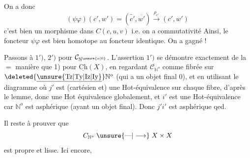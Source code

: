 On a donc
\[
(\psi\varphi)(c',w')=(\widetilde{c'},\overline{w'})\xrightarrow{\rho_{c'}}(c',w')
\]
c'est bien un morphisme dans $C(c,u,v)$ i.e. on a commutativité 
Ainsi, le foncteur $\psi\varphi$ est bien homotope au foncteur identique. On a gagné !

Passons à $1')$, $2')$ pour $\mathcal C_{\mathbb N^{\unsure{o|0}}}$. L'assertion $1')$ se démontre exactement de la $=$ manière que 1) pour $\underline{\mathrm{Ch}}(X)$, en regardant $\mathcal C_{\mathbb N^o}$ comme fibrée sur $\deleted{\underline{\unsure{\mathrm{Tz}|\mathrm{Ty}|\mathrm{Iz}|\mathrm{Iy}}}}\mathbb N^o$ (qui a un objet final $0$), et en utilisant le diagramme
 où $j'$ est (cartésien et) une Hot-équivalence sur chaque fibre, d'après le lemme, donc une Hot équivalence  globalement, et $i'$ est une Hot-équivalence car $\mathbb N^o$ est asphérique (ayant un objet final). Donc $j'i'$ est asphérique qed.

Il reste à prouver que
\[
C_{\mathbb N^o}\mathrel{\unsure{\text{---}|\longrightarrow}}X\times X
\]
est propre et lisse.  Ici encore,
